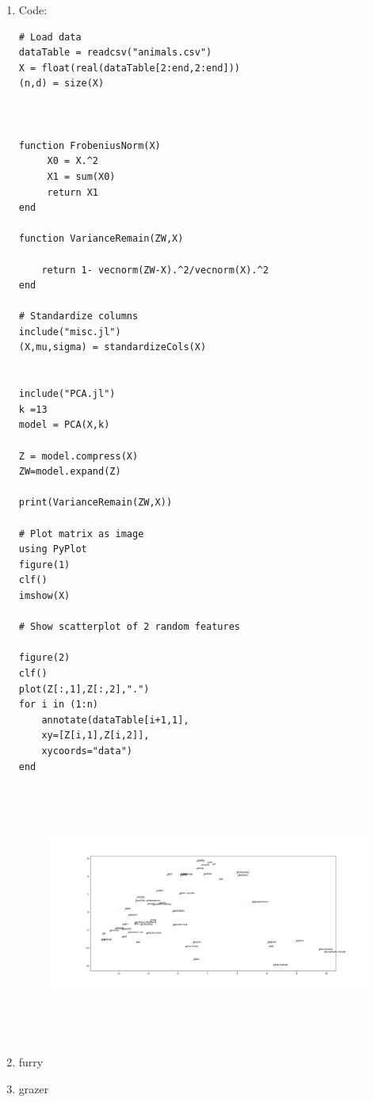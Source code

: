 \documentclass{article}
\begin{document}
\begin{enumerate}
\item  Code: 
\begin{verbatim}
# Load data
dataTable = readcsv("animals.csv")
X = float(real(dataTable[2:end,2:end]))
(n,d) = size(X)



function FrobeniusNorm(X)
     X0 = X.^2
     X1 = sum(X0)
     return X1
end

function VarianceRemain(ZW,X)

    return 1- vecnorm(ZW-X).^2/vecnorm(X).^2
end

# Standardize columns
include("misc.jl")
(X,mu,sigma) = standardizeCols(X)


include("PCA.jl")
k =13
model = PCA(X,k)

Z = model.compress(X)
ZW=model.expand(Z)

print(VarianceRemain(ZW,X))

# Plot matrix as image
using PyPlot
figure(1)
clf()
imshow(X)

# Show scatterplot of 2 random features

figure(2)
clf()
plot(Z[:,1],Z[:,2],".")
for i in (1:n)
    annotate(dataTable[i+1,1],
    xy=[Z[i,1],Z[i,2]],
    xycoords="data")
end

\end{verbatim}


\begin{figure}[h!]
    \includegraphics[width=50em,height=8.5cm]{q3_2_1_a.png}
\end{figure}
\item furry
\item grazer
\end{enumerate}
\end{document}
